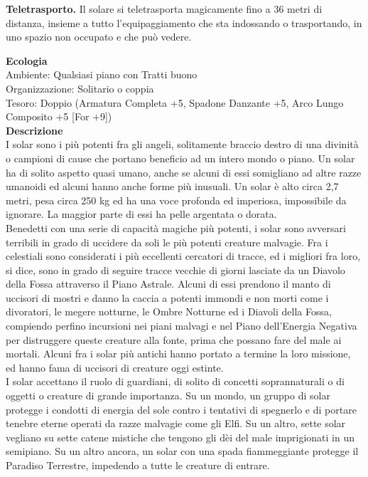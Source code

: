 \begin{multicols}{2}
\textbf{Teletrasporto.} Il solare si teletrasporta magicamente fino a 36 metri di distanza, insieme a tutto l'equipaggiamento che sta indossando o trasportando, in uno spazio non occupato e che può vedere.

\textbf{Ecologia}\\
Ambiente: Qualsiasi piano con Tratti buono\\
Organizzazione: Solitario o coppia\\
Tesoro: Doppio (Armatura Completa +5, Spadone Danzante +5, Arco Lungo Composito +5 [For +9])\\
\textbf{Descrizione}\\
I solar sono i più potenti fra gli angeli, solitamente braccio destro di una divinità o campioni di cause che portano beneficio ad un intero mondo o piano. Un solar ha di solito aspetto quasi umano, anche se alcuni di essi somigliano ad altre razze umanoidi ed alcuni hanno anche forme più inusuali. Un solar è alto circa 2,7 metri, pesa circa 250 kg ed ha una voce profonda ed imperiosa, impossibile da ignorare. La maggior parte di essi ha pelle argentata o dorata.\\
Benedetti con una serie di capacità magiche più potenti, i solar sono avversari terribili in grado di uccidere da soli le più potenti creature malvagie. Fra i celestiali sono considerati i più eccellenti cercatori di tracce, ed i migliori fra loro, si dice, sono in grado di seguire tracce vecchie di giorni lasciate da un Diavolo della Fossa attraverso il Piano Astrale. Alcuni di essi prendono il manto di uccisori di mostri e danno la caccia a potenti immondi e non morti come i divoratori, le megere notturne, le Ombre Notturne ed i Diavoli della Fossa, compiendo perfino incursioni nei piani  malvagi e nel Piano dell'Energia Negativa per distruggere queste creature alla fonte, prima che possano fare del male ai mortali. Alcuni fra i solar più antichi hanno portato a termine la loro missione, ed hanno fama di uccisori di creature oggi estinte.\\
I solar accettano il ruolo di guardiani, di solito di concetti soprannaturali o di oggetti o creature di grande importanza. Su un mondo, un gruppo di solar protegge i condotti di energia del sole contro i tentativi di spegnerlo e di portare tenebre eterne operati da razze malvagie come gli Elfi. Su un altro, sette solar vegliano su sette catene mistiche che tengono gli dèi del male imprigionati in un semipiano. Su un altro ancora, un solar con una spada fiammeggiante protegge il Paradiso Terrestre, impedendo a tutte le creature di entrare.\\

\end{multicols}
